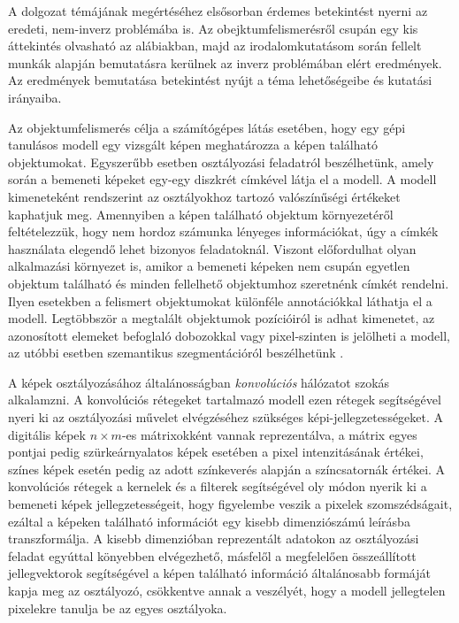 
A dolgozat témájának megértéséhez elsősorban érdemes betekintést nyerni az eredeti, nem-inverz problémába is. Az obejktumfelismerésről csupán egy kis áttekintés olvasható az alábiakban, majd az irodalomkutatásom során fellelt munkák alapján bemutatásra kerülnek az inverz problémában elért eredmények. Az eredmények bemutatása betekintést nyújt a téma lehetőségeibe és kutatási irányaiba.

Az objektumfelismerés célja a számítógépes látás esetében, hogy egy gépi tanulásos modell egy vizsgált képen meghatározza a képen található objektumokat. Egyszerűbb esetben osztályozási feladatról beszélhetünk, amely során a bemeneti képeket egy-egy diszkrét címkével látja el a modell. A modell kimeneteként rendszerint az osztályokhoz tartozó valószínűségi értékeket kaphatjuk meg. Amennyiben a képen található objektum környezetéről feltételezzük, hogy nem hordoz számunka lényeges információkat, úgy a címkék használata elegendő lehet bizonyos feladatoknál. Viszont előfordulhat olyan alkalmazási környezet is, amikor a bemeneti képeken nem csupán egyetlen objektum található és minden fellelhető objektumhoz szeretnénk címkét rendelni. Ilyen esetekben a felismert objektumokat különféle annotációkkal láthatja el a modell. Legtöbbször a megtalált objektumok pozícióiról is adhat kimenetet, az azonosított elemeket befoglaló dobozokkal \cite{redmon2016you} vagy pixel-szinten is jelölheti a modell, az utóbbi esetben szemantikus szegmentációról beszélhetünk \cite{long2015fully}.

A képek osztályozásához általánosságban \textit{konvolúciós} hálózatot szokás alkalamzni. A konvolúciós rétegeket tartalmazó modell ezen rétegek segítségével nyeri ki az osztályozási művelet elvégzéséhez szükséges képi-jellegzetességeket. A digitális képek $n \times m$-es mátrixokként vannak reprezentálva, a mátrix egyes pontjai pedig szürkeárnyalatos képek esetében a pixel intenzitásának értékei, színes képek esetén pedig az adott színkeverés alapján a színcsatornák értékei. A konvolúciós rétegek a kernelek és a filterek segítségével oly módon nyerik ki a bemeneti képek jellegzetességeit, hogy figyelembe veszik a pixelek szomszédságait, ezáltal a képeken található információt egy kisebb dimenziószámú leírásba transzformálja. A kisebb dimenzióban reprezentált adatokon az osztályozási feladat egyúttal könyebben elvégezhető, másfelől a megfelelően összeállított jellegvektorok segítségével a képen található információ általánosabb formáját kapja meg az osztályozó, csökkentve annak a veszélyét, hogy a modell jellegtelen pixelekre tanulja be az egyes osztályoka.

